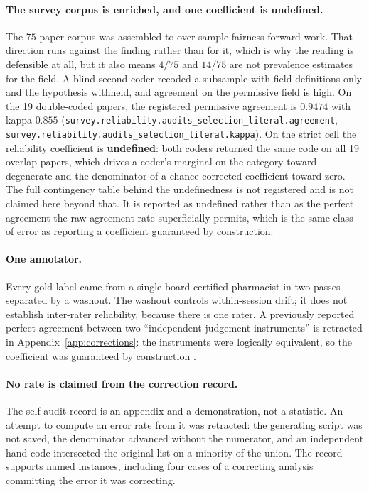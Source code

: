 \paragraph{The survey corpus is enriched, and one coefficient is undefined.} The
$75$-paper corpus was assembled to over-sample fairness-forward work. That
direction runs against the finding rather than for it, which is why the reading
is defensible at all, but it also means $4/75$ and $14/75$ are not prevalence
estimates for the field. A blind second coder recoded a subsample with field
definitions only and the hypothesis withheld, and agreement on the permissive
field is high. On the 19 double-coded papers, the registered permissive
agreement is $0.9474$ with kappa $0.855$
(\texttt{survey.reliability.audits\_selection\_literal.agreement},
\texttt{survey.reliability.audits\_selection\_literal.kappa}). On the strict cell the reliability coefficient is
\textbf{undefined}: both coders returned the same code on all 19 overlap
papers, which drives a coder's marginal on the category toward degenerate and
the denominator of a chance-corrected coefficient toward zero. The full
contingency table behind the undefinedness is not registered and is not
claimed here beyond that. It is reported as undefined rather than as the
perfect agreement the raw agreement rate superficially permits, which is the
same class of error as reporting a coefficient guaranteed by construction.

\paragraph{One annotator.} Every gold label came from a single board-certified
pharmacist in two passes separated by a washout. The washout controls
within-session drift; it does not establish inter-rater reliability, because
there is one rater. A previously reported perfect agreement between two
``independent judgement instruments'' is retracted in
Appendix~\ref{app:corrections}: the instruments were logically equivalent, so the
coefficient was guaranteed by construction \citep{cohen1960kappa}.

\paragraph{No rate is claimed from the correction record.} The self-audit record
is an appendix and a demonstration, not a statistic. An attempt to compute an
error rate from it was retracted: the generating script was not saved, the
denominator advanced without the numerator, and an independent hand-code
intersected the original list on a minority of the union. The record supports
named instances, including four cases of a correcting analysis committing the
error it was correcting.

